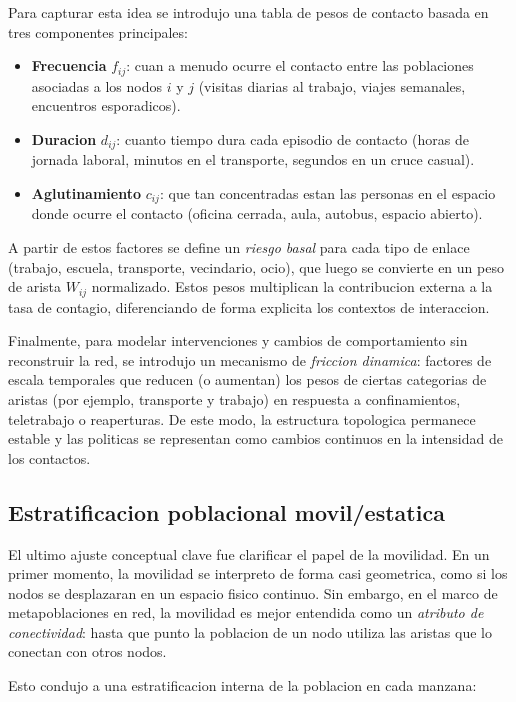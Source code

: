 Para capturar esta idea se introdujo una tabla de pesos de contacto basada en tres componentes principales:

\begin{itemize}
    \item \textbf{Frecuencia} $f_{ij}$: cuan a menudo ocurre el contacto entre las poblaciones asociadas a los nodos $i$ y $j$ (visitas diarias al trabajo, viajes semanales, encuentros esporadicos).
    \item \textbf{Duracion} $d_{ij}$: cuanto tiempo dura cada episodio de contacto (horas de jornada laboral, minutos en el transporte, segundos en un cruce casual).
    \item \textbf{Aglutinamiento} $c_{ij}$: que tan concentradas estan las personas en el espacio donde ocurre el contacto (oficina cerrada, aula, autobus, espacio abierto).
\end{itemize}

A partir de estos factores se define un \emph{riesgo basal} para cada tipo de enlace (trabajo, escuela, transporte, vecindario, ocio), que luego se convierte en un peso de arista $W_{ij}$ normalizado. Estos pesos multiplican la contribucion externa a la tasa de contagio, diferenciando de forma explicita los contextos de interaccion.

Finalmente, para modelar intervenciones y cambios de comportamiento sin reconstruir la red, se introdujo un mecanismo de \emph{friccion dinamica}: factores de escala temporales que reducen (o aumentan) los pesos de ciertas categorias de aristas (por ejemplo, transporte y trabajo) en respuesta a confinamientos, teletrabajo o reaperturas. De este modo, la estructura topologica permanece estable y las politicas se representan como cambios continuos en la intensidad de los contactos.

\subsection{Estratificacion poblacional movil/estatica}

El ultimo ajuste conceptual clave fue clarificar el papel de la movilidad. En un primer momento, la movilidad se interpreto de forma casi geometrica, como si los nodos se desplazaran en un espacio fisico continuo. Sin embargo, en el marco de metapoblaciones en red, la movilidad es mejor entendida como un \emph{atributo de conectividad}: hasta que punto la poblacion de un nodo utiliza las aristas que lo conectan con otros nodos.

Esto condujo a una estratificacion interna de la poblacion en cada manzana:

